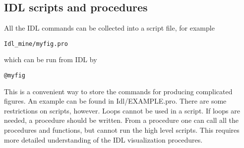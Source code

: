 \subsection{IDL scripts and procedures \label{s-idl-script}}

All the IDL commands can be collected into a script file, for example 
\begin{verbatim}
Idl_mine/myfig.pro
\end{verbatim}
which can be run from IDL by
\begin{verbatim}
@myfig
\end{verbatim}
This is a convenient way to store the commands for producing complicated 
figures. An example can be found in Idl/EXAMPLE.pro. There are some
restrictions on scripts, however. Loops cannot be used in a script.
If loops are needed, a procedure should be written. From a procedure
one can call all the procedures and functions, but cannot run the
high level scripts. This requires more detailed understanding of the 
IDL visualization procedures.

%
